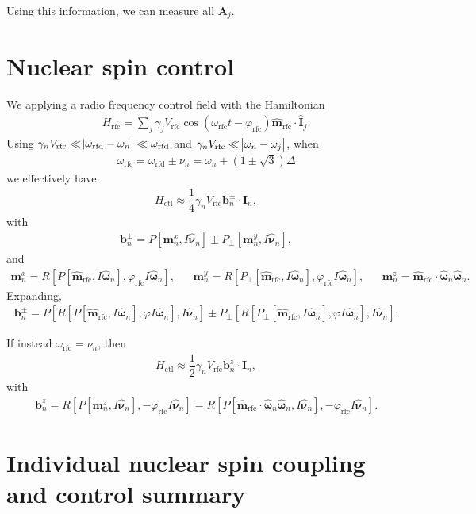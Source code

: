 \documentclass[11pt]{article}
\renewcommand{\t}{\text} %
\newcommand{\f}[2]{\dfrac{#1}{#2}} %
\newcommand{\p}[1]{\left(#1\right)} %
\renewcommand{\sp}[1]{\left[#1\right]} %
\renewcommand{\v}{\bm} %
\newcommand{\uv}[1]{\hat{\v{#1}}} %
\renewcommand{\c}{\cdot} %
\renewcommand{\phi}{\varphi} %
\begin{document}
Using this information, we can measure all $\v A_j$.

\newpage
\section*{Nuclear spin control}

We applying a radio frequency control field with the Hamiltonian
\begin{align}
  H_{\t{rfc}}=\sum_j\gamma_jV_{\t{rfc}}\cos\p{\omega_{\t{rfc}}t-\phi_{\t{rfc}}}
  \uv m_{\t{rfc}}\c\uv I_j.
\end{align}
Using
$\gamma_nV_{\t{rfc}}\ll\abs{\omega_{\t{rfd}}-\omega_n}\ll\omega_{\t{rfd}}$
and $\gamma_nV_{\t{rfc}}\ll\abs{\omega_n-\omega_j}$, when
\begin{align}
  \omega_{\t{rfc}}=\omega_{\t{rfd}}\pm\nu_n=\omega_n+\p{1\pm\sqrt3}\Delta
\end{align}
we effectively have
\begin{align}
  H_{\t{ctl}}\approx\f14\gamma_nV_{\t{rfc}}\v b_n^\pm\c\v I_n,
\end{align}
with
\begin{align}
  \v b_n^\pm=P\sp{\v m_n^x,I\uv\nu_n}\pm P_\perp\sp{\v m_n^y,
    I\uv\nu_n},
\end{align}
and
\begin{align}
  \v m_n^x=R\sp{P\sp{\uv m_{\t{rfc}},I\uv\omega_n},
    \phi_{\t{rfc}}I\uv\omega_n}, && \v m_n^y=R\sp{P_\perp\sp{\uv
      m_{\t{rfc}},I\uv\omega_n}, \phi_{\t{rfc}}I\uv\omega_n}, && \v
  m_n^z=\uv m_{\t{rfc}}\c\uv\omega_n\uv\omega_n.
\end{align}
Expanding,
\begin{align}
  \v b_n^\pm=P\sp{R\sp{P\sp{\uv m_{\t{rfc}},I\uv\omega_n}, \phi
      I\uv\omega_n},I\uv\nu_n}\pm P_\perp\sp{R\sp{P_\perp\sp{\uv
        m_{\t{rfc}},I\uv\omega_n},\phi I\uv\omega_n},I\uv\nu_n}.
\end{align}

If instead $\omega_{\t{rfc}}=\nu_n$, then
\begin{align}
  H_{\t{ctl}}\approx\f12\gamma_nV_{\t{rfc}}\v b_n^z\c\v I_n,
\end{align}
with
\begin{align}
  \v b_n^z=R\sp{P\sp{\v m_n^z,I\uv\nu_n},-\phi_{\t{rfc}}I\uv\nu_n}
  =R\sp{P\sp{\uv m_{\t{rfc}}\c\uv\omega_n\uv\omega_n,I\uv\nu_n},
    -\phi_{\t{rfc}}I\uv\nu_n}.
\end{align}

\newpage
\section*{Individual nuclear spin coupling and control summary}
\end{document}
